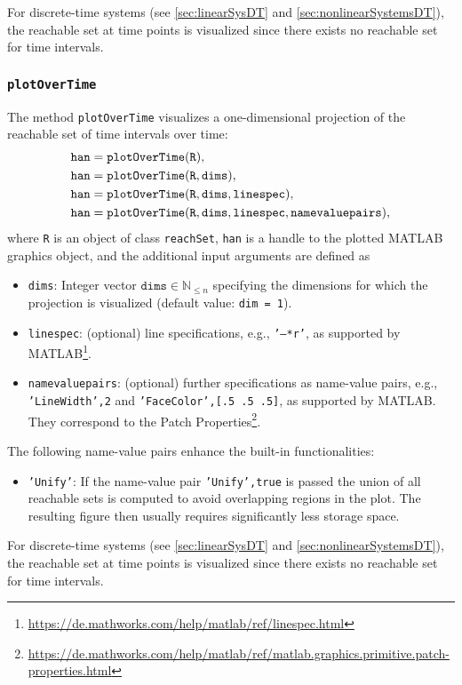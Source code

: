 For discrete-time systems (see \cref{sec:linearSysDT} and \cref{sec:nonlinearSystemsDT}), the reachable set at time points is visualized since there exists no reachable set for time intervals.


\subsubsection{\texttt{plotOverTime}}

The method \texttt{plotOverTime} visualizes a one-dimensional projection of the reachable set of time intervals over time:
%
\begin{align*}
	\begin{split}
		&\texttt{han} = {\normalfont \texttt{plotOverTime}}(\texttt{R}), \\
		&\texttt{han} = {\normalfont \texttt{plotOverTime}}(\texttt{R},\texttt{dims}), \\
		&\texttt{han} = {\normalfont \texttt{plotOverTime}}(\texttt{R},\texttt{dims},\texttt{linespec}), \\
		&\texttt{han} = {\normalfont \texttt{plotOverTime}}(\texttt{R},\texttt{dims},\texttt{linespec},\texttt{namevaluepairs}),
	\end{split}
\end{align*}
where \texttt{R} is an object of class \texttt{reachSet}, \texttt{han} is a handle to the plotted MATLAB graphics object, and the additional input arguments are defined as

\begin{itemize}
	\item \texttt{dims}: Integer vector $\texttt{dims} \in \mathbb{N}_{\leq n}$ specifying the dimensions for which the projection is visualized (default value: \texttt{dim = 1}).
	\item \texttt{linespec}: (optional) line specifications, e.g., \texttt{'--*r'}, as supported by MATLAB\footnote{\url{https://de.mathworks.com/help/matlab/ref/linespec.html}}.
	\item \texttt{namevaluepairs}: (optional) further specifications as name-value pairs, e.g.,
	\texttt{'LineWidth',2} and \texttt{'FaceColor',[.5 .5 .5]}, as supported by MATLAB.
	They correspond to the Patch Properties\footnote{\url{https://de.mathworks.com/help/matlab/ref/matlab.graphics.primitive.patch-properties.html}}.
\end{itemize}
%
The following name-value pairs enhance the built-in functionalities:
\begin{itemize}	
	\item \texttt{'Unify'}: If the name-value pair \texttt{'Unify',true} is passed the union of all reachable sets is computed to avoid overlapping regions in the plot. The resulting figure then usually requires significantly less storage space. %
\end{itemize}
For discrete-time systems (see \cref{sec:linearSysDT} and \cref{sec:nonlinearSystemsDT}), the reachable set at time points is visualized since there exists no reachable set for time intervals.


